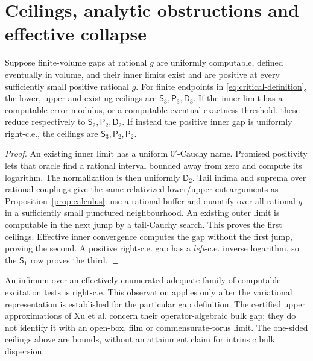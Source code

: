 \section{Ceilings, analytic obstructions and effective collapse}\label{sec:ceilings}
\begin{proposition}\label{prop:critical-ceiling}
Suppose finite-volume gaps at rational $g$ are uniformly computable,
defined eventually in volume, and their inner limits exist and are
positive at every sufficiently small positive rational $g$. For finite
endpoints in \eqref{eq:critical-definition}, the lower, upper and
existing ceilings are $\mathsf S_3,\mathsf P_3,\mathsf D_3$.
If the inner limit has a computable error modulus, or a computable
eventual-exactness threshold, these reduce respectively to
$\mathsf S_2,\mathsf P_2,\mathsf D_2$.
If instead the positive inner gap is uniformly right-c.e., the
ceilings are $\mathsf S_3,\mathsf P_2,\mathsf P_2$.
\end{proposition}
\begin{proof}
An existing inner limit has a uniform $0'$-Cauchy name. Promised
positivity lets that oracle find a rational interval bounded away
from zero and compute its logarithm. The normalization is then
uniformly $\mathsf D_2$. Tail infima and suprema over rational
couplings give the same relativized lower/upper cut arguments as
Proposition~\ref{prop:calculus}: use a rational buffer and quantify
over all rational $g$ in a sufficiently small punctured neighbourhood.
An existing outer limit is computable in the next jump by a
tail-Cauchy search. This proves the first ceilings. Effective inner
convergence computes the gap without the first jump, proving the
second. A positive right-c.e. gap has a \emph{left}-c.e. inverse
logarithm, so the $\mathsf S_1$ row proves the third.
\end{proof}

An infimum over an effectively enumerated adequate family of
computable excitation tests is right-c.e. This observation applies
only after the variational representation is established for the
particular gap definition. The certified upper approximations of
Xu et al. \cite{bulkGap} concern their operator-algebraic bulk gap;
they do not identify it with an open-box, film or commensurate-torus
limit. The one-sided ceilings above are bounds, without an attainment
claim for intrinsic bulk dispersion.

